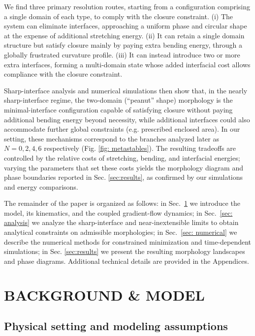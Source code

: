 \documentclass[
aip,
jcp,
reprint, 
floatfix
]{revtex4-1}
\begin{document}
We find three primary resolution routes, starting from a configuration comprising a single domain of each type, to comply with the closure constraint. (i) The system can eliminate interfaces, approaching a uniform phase and circular shape at the expense of additional stretching energy. (ii) It can retain a single domain structure but satisfy closure mainly by paying extra bending energy, through a globally frustrated curvature profile. (iii) It can instead introduce two or more extra interfaces, forming a multi-domain state whose added interfacial cost allows compliance with the closure constraint. 

Sharp-interface analysis and numerical simulations then show that, in the nearly sharp-interface regime, the two-domain (``peanut'' shape) morphology is the minimal-interface configuration capable of satisfying closure without paying additional bending energy beyond necessity, while additional interfaces could also accommodate further global constraints (e.g. prescribed enclosed area). In our setting, these mechanisms correspond to the branches analyzed later as $N=0,2,4, 6$ respectively (Fig. \ref{fig: metastables}). The resulting tradeoffs are controlled by the relative costs of stretching, bending, and interfacial energies; varying the parameters that set these costs yields the morphology diagram and phase boundaries reported in Sec. \ref{sec:results}, as confirmed by our simulations and energy comparisons.


The remainder of the paper is organized as follows: in Sec.~\ref{sec: background} we introduce the model, its kinematics, and the coupled gradient-flow dynamics; in Sec.~\ref{sec: analysis} we analyze the sharp-interface and near-inextensible limits to obtain analytical constraints on admissible morphologies; in Sec.~\ref{sec: numerical} we describe the numerical methods for constrained minimization and time-dependent simulations; in Sec. \ref{sec:results} we present the resulting morphology landscapes and phase diagrams. Additional technical details are provided in the Appendices. 


\section{BACKGROUND \& MODEL} \label{sec: background}

\subsection{Physical setting and modeling assumptions}\label{sec: assumptions}
\end{document}
